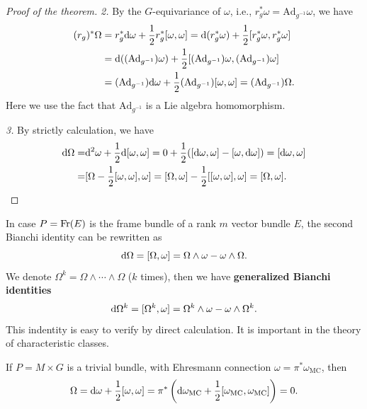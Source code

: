 \begin{proof}[Proof of the theorem]
    \textit{2.} By the $G$-equivariance of $\omega$, i.e., $r_g^*\omega = \mathrm{Ad}_{g^{-1}}\omega$, we have
    \begin{align*}
        (r_g)^*\Omega &= r_g^*{\rm d}\omega + \frac{1}{2}r_g^*[\omega, \omega] 
        = {\rm d}(r_g^*\omega) + \frac{1}{2}[r_g^*\omega, r_g^*\omega] \\
        &= {\rm d}((\mathrm{Ad}_{g^{-1}})\omega) + \frac{1}{2}[(\mathrm{Ad}_{g^{-1}})\omega, (\mathrm{Ad}_{g^{-1}})\omega] \\ 
        &= (\mathrm{Ad}_{g^{-1}}){\rm d}\omega + \frac{1}{2}(\mathrm{Ad}_{g^{-1}})[\omega, \omega]
        = (\mathrm{Ad}_{g^{-1}})\Omega.
    \end{align*} 
    Here we use the fact that $\mathrm{Ad}_{g^{-1}}$ is a Lie algebra homomorphism.

    \textit{3.} By strictly calculation, we have
    \begin{align*}
        {\rm d}\Omega =& {\rm d}^2\omega + \frac{1}{2}{\rm d}[\omega, \omega] 
        = 0 + \frac{1}{2}([{\rm d}\omega, \omega] - [\omega, {\rm d}\omega]) 
        = [{\rm d}\omega, \omega] \\
        =& [\Omega - \frac{1}{2}[\omega, \omega], \omega] 
        = [\Omega, \omega] - \frac{1}{2}[[\omega, \omega], \omega] 
        = [\Omega, \omega]. \qedhere
    \end{align*}
\end{proof}
\begin{example}
    In case $P=\mathrm{Fr}(E)$ is the frame bundle of a rank $m$ vector bundle $E$, the second Bianchi identity can be rewritten as
    \begin{equation*}
        {\rm d}\Omega = [\Omega, \omega] = \Omega\wedge\omega - \omega\wedge\Omega.
    \end{equation*}
    We denote $\Omega^k = \Omega\wedge\cdots\wedge\Omega$ ($k$ times), then we have \textbf{generalized Bianchi identities}
    \begin{equation*}
        {\rm d}\Omega^k = [\Omega^k, \omega] = \Omega^k\wedge\omega - \omega\wedge\Omega^k.
    \end{equation*}
    This indentity is easy to verify by direct calculation. It is important in the theory of characteristic classes.
\end{example}
\begin{example}
    If $P=M\times G$ is a trivial bundle, with Ehresmann connection $\omega = \pi^*\omega_{\mathrm{MC}}$, then 
    \begin{equation*}
        \Omega = {\rm d}\omega + \frac{1}{2}[\omega, \omega] = \pi^*\left({\rm d}\omega_{\mathrm{MC}} + \frac{1}{2}[\omega_{\mathrm{MC}}, \omega_{\mathrm{MC}}]\right) = 0.
    \end{equation*}
\end{example}
